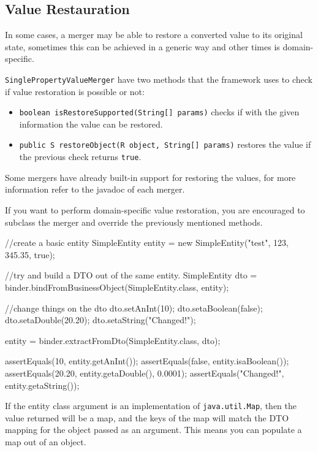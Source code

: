 \documentclass[11pt]{article}
\begin{document}
\subsection{Value Restauration}

In some cases, a merger may be able to restore a converted value to its original state, sometimes this can be achieved in a generic way and other times is domain-specific.

\texttt{SinglePropertyValueMerger} have two methods that the framework uses to check if value restoration is possible or not:

\begin{itemize}

\item \texttt{boolean isRestoreSupported(String[] params)} checks if with the given information the value can be restored.
\item \texttt{public S restoreObject(R object, String[] params)} restores the value if the previous check returns \texttt{true}.

\end{itemize}

Some mergers have already built-in support for restoring the values, for more information refer to the javadoc of each merger.

If you want to perform domain-specific value restoration, you are encouraged to subclass the merger and override the previously mentioned methods.

\begin{java}
//create a basic entity
SimpleEntity entity = new SimpleEntity("test", 123, 345.35, true);

//try and build a DTO out of the same entity.
SimpleEntity dto = 
    binder.bindFromBusinessObject(SimpleEntity.class, entity);

//change things on the dto
dto.setAnInt(10);
dto.setaBoolean(false);
dto.setaDouble(20.20);
dto.setaString("Changed!");

entity = binder.extractFromDto(SimpleEntity.class, dto);


assertEquals(10, entity.getAnInt());
assertEquals(false, entity.isaBoolean());
assertEquals(20.20, entity.getaDouble(), 0.0001);
assertEquals("Changed!", entity.getaString());
\end{java}


If the entity class argument is an implementation of \texttt{java.util.Map}, then the value returned will be a map, and the keys of the map will match the DTO mapping for the object passed as an argument. This means you can populate a map out of an object.
\clearpage
\end{document}
